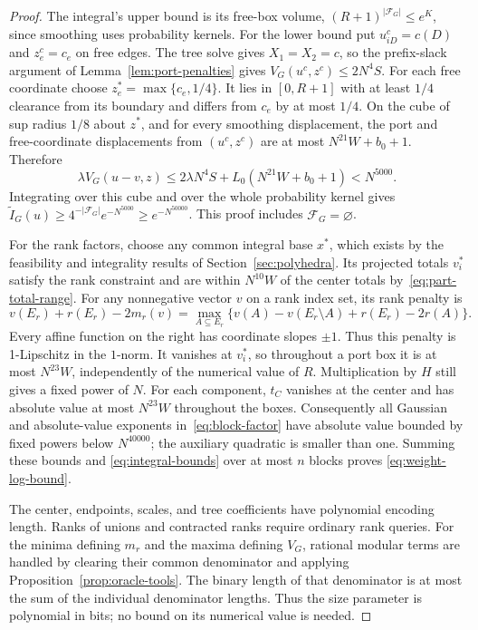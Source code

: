 \begin{proof}
The integral's upper bound is its free-box volume,
$(R+1)^{|\mathcal F_G|}\le e^K$, since smoothing uses probability kernels.
For the lower bound put $u^c_{iD}=c(D)$ and $z^c_e=c_e$ on free edges.
The tree solve gives $X_1=X_2=c$, so the prefix-slack argument of
Lemma~\ref{lem:port-penalties} gives
$V_G(u^c,z^c)\le2N^4S$. For each free coordinate choose
$z^*_e=\max\{c_e,1/4\}$. It lies in $[0,R+1]$ with at least $1/4$
clearance from its boundary and differs from $c_e$ by at most $1/4$.
On the cube of sup radius $1/8$ about $z^*$, and for every smoothing
displacement, the port and free-coordinate displacements from
$(u^c,z^c)$ are at most $N^{21}W+b_0+1$. Therefore
\begin{equation}\label{eq:near-center-penalty}
 \lambda V_G(u-v,z)
 \le2\lambda N^4S+L_0(N^{21}W+b_0+1)<N^{5000}.
\end{equation}
Integrating over this cube and over the whole probability kernel gives
$\widetilde I_G(u)\ge4^{-|\mathcal F_G|}e^{-N^{5000}}
\ge e^{-N^{50000}}$. This proof includes $\mathcal F_G=\varnothing$.

For the rank factors, choose any common integral base $x^*$, which
exists by the feasibility and integrality results of Section~\ref{sec:polyhedra}.
Its projected totals $v^*_i$ satisfy the rank constraint and are within
$N^{10}W$ of the center totals by~\eqref{eq:part-total-range}.
For any nonnegative vector $v$ on a rank index set, its rank penalty is
\[
 v(E_r)+r(E_r)-2m_r(v)
  =\max_{A\subseteq E_r}
       \{v(A)-v(E_r\setminus A)+r(E_r)-2r(A)\}.
\]
Every affine function on the right has coordinate slopes $\pm1$.
Thus this penalty is 1-Lipschitz in the $1$-norm. It vanishes at $v_i^*$,
so throughout a port box it is at most $N^{23}W$, independently of the
numerical value of $R$. Multiplication by $H$ still gives a fixed power
of $N$. For each component, $t_C$ vanishes at the center and has
absolute value at most $N^{23}W$ throughout the boxes. Consequently
all Gaussian and absolute-value exponents in~\eqref{eq:block-factor}
have absolute value bounded by fixed powers below $N^{40000}$; the
auxiliary quadratic is smaller than one. Summing these bounds and
\eqref{eq:integral-bounds} over at most $n$ blocks proves
\eqref{eq:weight-log-bound}.

The center, endpoints, scales, and tree coefficients have polynomial
encoding length. Ranks of unions and contracted ranks require ordinary
rank queries. For the minima defining $m_r$ and the maxima defining
$V_G$, rational modular terms are handled by clearing their common
denominator and applying Proposition~\ref{prop:oracle-tools}. The binary
length of that denominator is at most the sum of the individual
denominator lengths. Thus the size parameter is polynomial in bits;
no bound on its numerical value is needed.
\end{proof}


